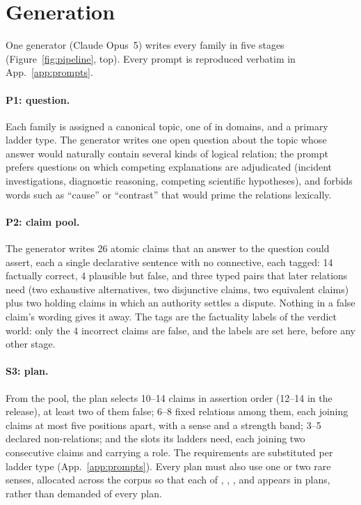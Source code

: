 \documentclass[11pt]{article}
\begin{document}
\section{Generation}
\label{sec:generation}



One generator (Claude Opus~5) writes every family in five stages (Figure~\ref{fig:pipeline},
top). Every prompt is reproduced verbatim in App.~\ref{app:prompts}.

\paragraph{P1: question.} Each family is assigned a canonical topic, one of \lbTopics{} in
\lbDomains{} domains, and a primary ladder type. The generator writes one open question about the
topic whose answer would naturally contain several kinds of logical relation; the prompt prefers
questions on which competing explanations are adjudicated (incident investigations, diagnostic
reasoning, competing scientific hypotheses), and forbids words such as ``cause'' or ``contrast''
that would prime the relations lexically.

\paragraph{P2: claim pool.} The generator writes 26 atomic claims that an answer to the question
could assert, each a single declarative sentence with no connective, each tagged: 14 factually
correct, 4 plausible but false, and three typed pairs that later relations need (two exhaustive
alternatives, two disjunctive claims, two equivalent claims) plus two holding claims in which an
authority settles a dispute. Nothing in a false claim's wording gives it away. The tags are the
factuality labels of the verdict world: only the 4 incorrect claims are false, and the labels are
set here, before any other stage.

\paragraph{S3: plan.} From the pool, the plan selects 10--14 claims in assertion order (12--14 in
the release), at least two of them false; 6--8 fixed relations among them, each joining claims at
most five positions apart, with a sense and a strength band; 3--5 declared non-relations; and the
slots its ladders need, each joining two consecutive claims and carrying a role. The requirements are
substituted per ladder type (App.~\ref{app:prompts}). Every plan must also use one or two rare
senses, allocated across the corpus so that each of , ,
,  and  appears in \lbRareAlternative{}
plans, rather than demanded of every plan.
\end{document}
